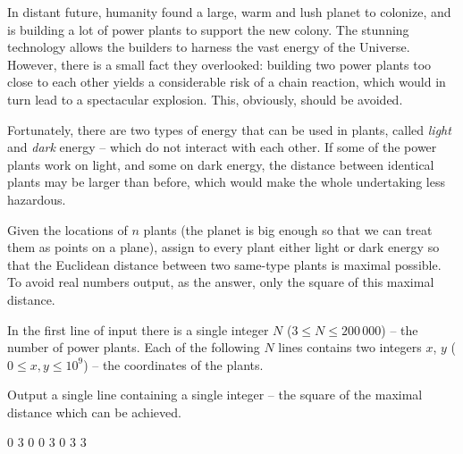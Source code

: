 





In distant future, humanity found a large, warm and lush planet to colonize, and is building a lot of power plants to support the new colony. The stunning technology allows the builders to harness the vast energy of the Universe. However, there is a small fact they overlooked: building two power plants too close to each other yields a considerable risk of a chain reaction, which would in turn lead to a spectacular explosion. This, obviously, should be avoided.

Fortunately, there are two types of energy that can be used in plants, called \textit{light} and \textit{dark} energy -- which do not interact with each other. If some of the power plants work on light, and some on dark energy, the distance between identical plants may be larger than before, which would make the whole undertaking less hazardous.




Given the locations of $n$ plants (the planet is big enough so that we can treat them as points on a plane), assign to every plant either light or dark energy so that the Euclidean distance between two same-type plants is maximal possible. To avoid real numbers output, as the answer, only the square of this maximal distance.


In the first line of input there is a single integer $N$ ($3 \leq N \leq 200\,000$) -- the number of power plants.
Each of the following $N$ lines contains two integers $x$, $y$ ($0 \leq x, y \leq 10^9$) -- the coordinates of the plants.


Output a single line containing a single integer -- the square of the maximal distance which can be achieved.



0 3
0 0
3 0
3 3
\sampleCOMMENT
\sampleEND




